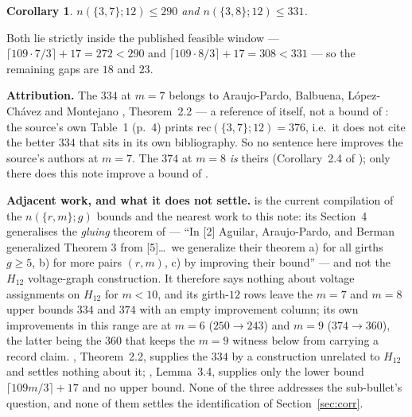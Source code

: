 \documentclass[11pt]{amsart}
\newtheorem{corollary}[theorem]{Corollary}
\theoremstyle{remark}
\begin{document}
\begin{corollary}\label{cor:record}
$n(\{3,7\};12)\le 290$ and $n(\{3,8\};12)\le 331$.
\end{corollary}

Both lie strictly inside the published feasible window --- $\lceil 109\cdot7/3\rceil+17=272<290$
and $\lceil 109\cdot 8/3\rceil+17=308<331$ --- so the remaining gaps are $18$ and $23$.

\medskip
\noindent\textbf{Attribution.} The $334$ at $m=7$ belongs to Araujo-Pardo, Balbuena,
L\'opez-Ch\'avez and Montejano \cite{ABLM}, Theorem~2.2 --- a reference of \cite{AAB} itself,
not a bound of \cite{AAB}: the source's own Table~1 (p.~4) prints
$\mathrm{rec}(\{3,7\};12)=376$, i.e.\ it does not cite the better $334$ that sits in its own
bibliography. So no sentence here improves the source's authors at $m=7$. The $374$ at $m=8$
\emph{is} theirs (Corollary~2.4 of \cite{AAB}); only there does this note improve a bound of
\cite{AAB}.

\medskip
\noindent\textbf{Adjacent work, and what it does not settle.} \cite{GJV} is the current
compilation of the $n(\{r,m\};g)$ bounds and the nearest work to this note: its Section~4
generalises the \emph{gluing} theorem of \cite{AAB} --- ``In [2] Aguilar, Araujo-Pardo, and
Berman generalized Theorem 3 from [5]\dots\ we generalize their theorem a) for all girths
$g\ge5$, b) for more pairs $(r,m)$, c) by improving their bound'' --- and not the $H_{12}$
voltage-graph construction. It therefore says nothing about voltage assignments on $H_{12}$ for
$m<10$, and its girth-$12$ rows leave the $m=7$ and $m=8$ upper bounds $334$ and $374$ with an
empty improvement column; its own improvements in this range are at $m=6$ ($250\to243$) and
$m=9$ ($374\to360$), the latter being the $360$ that keeps the $m=9$ witness below from carrying
a record claim. \cite{ABLM}, Theorem~2.2, supplies the $334$ by a construction unrelated to
$H_{12}$ and settles nothing about it; \cite{ABGMV}, Lemma~3.4, supplies only the lower bound
$\lceil 109m/3\rceil+17$ and no upper bound. None of the three addresses the sub-bullet's
question, and none of them settles the identification of Section~\ref{sec:corr}.
\end{document}
